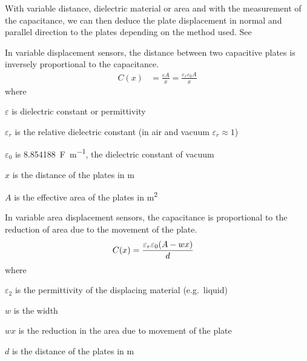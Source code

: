 With variable distance, dielectric material or area and with the measurement of the capacitance, we can then deduce the plate displacement in normal and parallel direction to the plates depending on the method used. See 

In variable displacement sensors, the distance between two capacitive plates is inversely proportional to the capacitance.
\begin{align}
  C(x) &= \frac{\varepsilon A}{x} = \frac{\varepsilon_r\varepsilon_0 A}{x}
\end{align}
where
\begin{description}[topsep=0ex, noitemsep]
  \item $\varepsilon$ is dielectric constant or permittivity
  \item $\varepsilon_r$ is the relative dielectric constant (in air and vacuum $\varepsilon_r\approx 1$)
  \item $\varepsilon_0$ is \SI{8.854188}{\farad\per\meter}, the dielectric constant of vacuum
  \item $x$ is the distance of the plates in \si{\meter}
  \item $A$ is the effective area of the plates in \si{\meter\squared}
\end{description}

In variable area displacement sensors, the capacitance is proportional to the reduction of area due to the movement of the plate.
\begin{align}
  C(x) &= \frac{\varepsilon_r\varepsilon_0\pqty{A-wx}}{d}\label{eqn:var_ar_displace}
\end{align}
where
\begin{description}[topsep=0ex, noitemsep]
  \item $\varepsilon_2$ is the permittivity of the displacing material (e.g.\ liquid)
  \item $w$ is the width
  \item $wx$ is the reduction in the area due to movement of the plate
  \item $d$ is the distance of the plates in \si{\meter}
\end{description}

